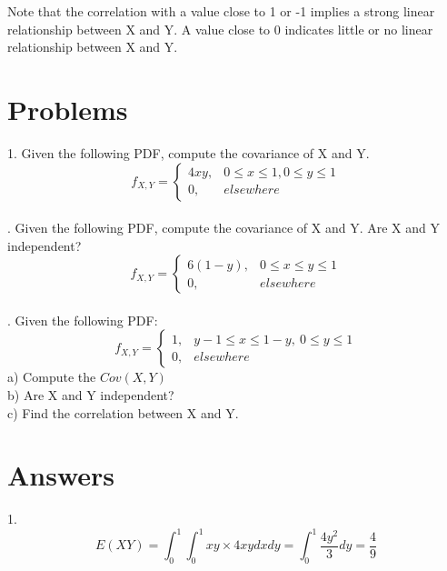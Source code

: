 \documentclass[11pt]{article}
\begin{document}
Note that the correlation with a value close to 1 or -1 implies a strong linear relationship between X and Y.
A value close to 0 indicates little or no linear relationship between X and Y.

\section{Problems}
1. Given the following PDF, compute the covariance of X and Y.
\begin{equation*}
  f_{X,Y} = \begin{cases}
    4xy, & 0 \leq x \leq 1, 0 \leq y \leq 1 \\
    0, & elsewhere
  \end{cases}
\end{equation*}
\\ . Given the following PDF, compute the covariance of X and Y. Are X and Y independent?
\begin{equation*}
  f_{X,Y} = \begin{cases}
    6(1-y), & 0 \leq x \leq y \leq 1 \\
    0, & elsewhere
  \end{cases}
\end{equation*}
\\ . Given the following PDF:
\begin{equation*}
  f_{X,Y} = \begin{cases}
    1, & y - 1 \leq x \leq 1 - y, \: 0 \leq y \leq 1 \\
    0, & elsewhere
  \end{cases}
\end{equation*} 
a) Compute the $Cov(X, Y)$ \\
b) Are X and Y independent? \\
c) Find the correlation between X and Y.
\section{Answers}
1. 
  $$E(XY) = \int_{0}^{1} \int_{0}^{1}xy \times 4xy dxdy 
        = \int_{0}^{1} \frac{4y^2}{3}dy 
        = \frac{4}{9}$$
\end{document}
